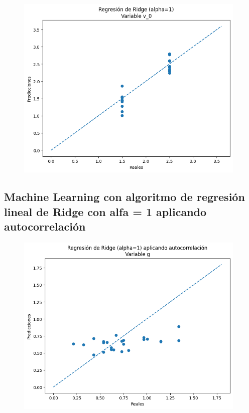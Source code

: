 \documentclass[oneside,openright,titlepage,numbers=noenddot,openany,headinclude,footinclude=true,
cleardoublepage=empty,abstractoff,BCOR=5mm,paper=a4,fontsize=12pt,main=spanish]{scrreprt}
\begin{document}
\begin{figure}[H]
	\centering
	\includegraphics[width=11cm]{Regresión de Ridge (alpha=1) Variable v_0.png}
\end{figure}

\subsection{Machine Learning con algoritmo de regresión lineal de Ridge con alfa = 1 aplicando autocorrelación}

\begin{figure}[H]
	\centering
	\includegraphics[width=11cm]{Regresión de Ridge (alpha=1) aplicando autocorrelación Variable g.png}
\end{figure}
\end{document}
